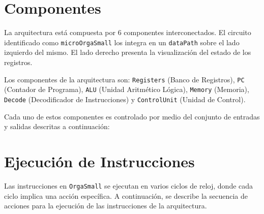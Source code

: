 \documentclass[12pt,twoside]{templates/unerthesis}
\begin{document}
\hypertarget{componentes}{%
\section{Componentes}\label{componentes}}

La arquitectura está compuesta por 6 componentes interconectados. El circuito identificado como \texttt{microOrgaSmall} los integra en un \texttt{dataPath} sobre el lado izquierdo del mismo. El lado derecho presenta la visualización del estado de los registros.

Los componentes de la arquitectura son: \texttt{Registers} (Banco de Registros), \texttt{PC} (Contador de Programa), \texttt{ALU} (Unidad Aritmético Lógica), \texttt{Memory} (Memoria), \texttt{Decode} (Decodificador de Instrucciones) y \texttt{ControlUnit} (Unidad de Control).

Cada uno de estos componentes es controlado por medio del conjunto de entradas y salidas descritas a continuación:

\hypertarget{ejecuciuxf3n-de-instrucciones}{%
\section{Ejecución de Instrucciones}\label{ejecuciuxf3n-de-instrucciones}}

Las instrucciones en \texttt{OrgaSmall} se ejecutan en varios ciclos de reloj, donde cada ciclo implica una acción específica. A continuación, se describe la secuencia de acciones para la ejecución de las instrucciones de la arquitectura.
\end{document}
